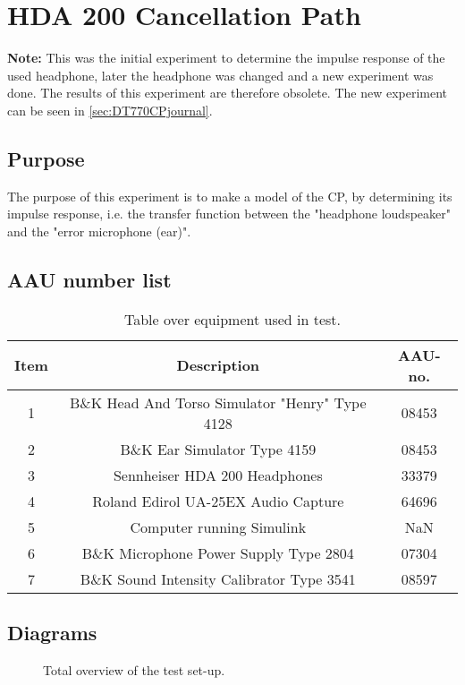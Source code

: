 \section{HDA 200 Cancellation Path} \label{sec:CPjournal}
\textbf{Note:} This was the initial experiment to determine the impulse response of the used headphone, later the headphone was changed and a new experiment was done. The results of this experiment are therefore obsolete. The new experiment can be seen in \autoref{sec:DT770CPjournal}.

\subsection{Purpose}
The purpose of this experiment is to make a model of the CP, by determining its impulse response, i.e. the transfer function between the "headphone loudspeaker" and the "error microphone (ear)".
		
\subsection{AAU number list}
\begin{table}[h]
	\centering
	\begin{tabular}{ c c c } \toprule
		{Item}	& {Description} 						& {AAU-no}. \\ \bottomrule 
		1	&	B\&K Head And Torso Simulator "Henry" Type 4128	& 08453		\\
		2	&	B\&K Ear Simulator Type 4159			& 08453		\\
		3	&	Sennheiser HDA 200	Headphones			& 33379		\\
		4	&	Roland Edirol UA-25EX Audio Capture		& 64696		\\
		5	&	Computer running Simulink				& NaN		\\
		6	&	B\&K Microphone Power Supply Type 2804 	& 07304		\\
		7	&	B\&K Sound Intensity Calibrator Type 3541	& 08597	\\ \bottomrule
	\end{tabular}
	\caption{Table over equipment used in test.}
	\label{tab:UsedEquipmentListningCP}
\end{table}

\subsection{Diagrams}
\begin{figure}[H]
	\centering
	
	\caption{Total overview of the test set-up.}
	\label{SchematicOverviewCP}
\end{figure}

